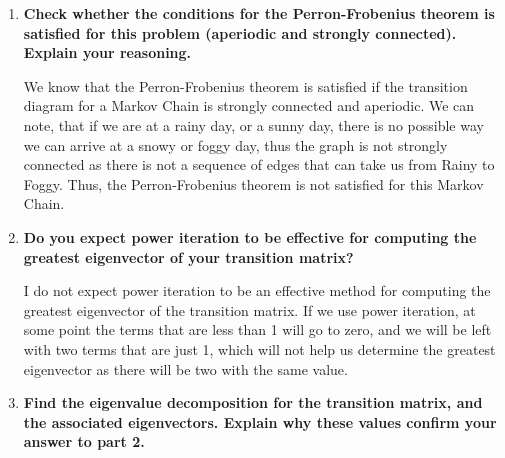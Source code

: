\documentclass[11pt]{article}
\begin{document}
\begin{enumerate}
\begin{center}
            \end{center}

        \item \textbf{Check whether the conditions for the Perron-Frobenius 
            theorem is satisfied for this problem (aperiodic and strongly 
            connected). Explain your reasoning.}

            We know that the Perron-Frobenius theorem is satisfied if the
            transition diagram for a Markov Chain is strongly connected and
            aperiodic. We can note, that if we are at a rainy day, or a sunny
            day, there is no possible way we can arrive at a snowy or foggy
            day, thus the graph is not strongly connected as there is not a
            sequence of edges that can take us from Rainy to Foggy. Thus, the
            Perron-Frobenius theorem is not satisfied for this Markov Chain.

        \item \textbf{Do you expect power iteration to be effective for 
            computing the greatest eigenvector of your transition matrix?}

            I do not expect power iteration to be an effective method for
            computing the greatest eigenvector of the transition matrix. If we
            use power iteration, at some point the terms that are less than 1
            will go to zero, and we will be left with two terms that are just
            1, which will not help us determine the greatest eigenvector as
            there will be two with the same value.

        \item \textbf{Find the eigenvalue decomposition for the transition matrix, 
            and the associated eigenvectors. Explain why these values confirm 
            your answer to part 2.}


\end{enumerate}
\end{document}
